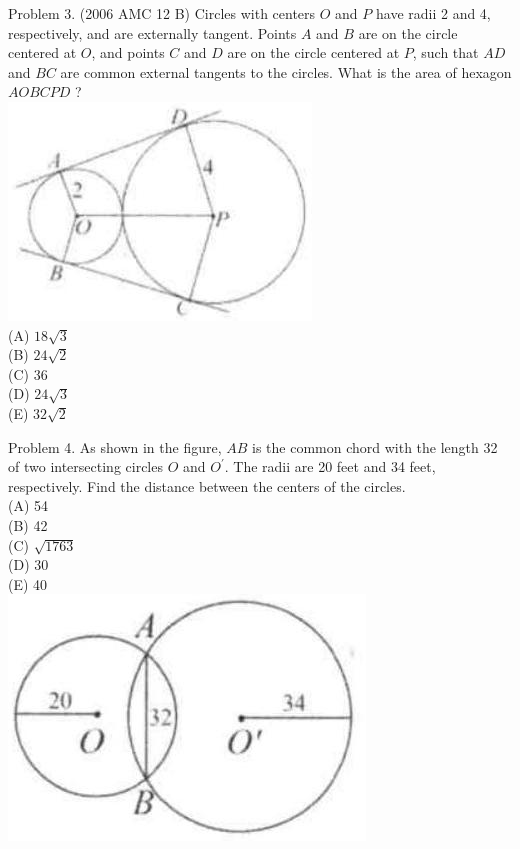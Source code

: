 \documentclass[10pt]{article}
\begin{document}
Problem 3. (2006 AMC 12 B) Circles with centers \(O\) and \(P\) have radii 2 and 4, respectively, and are externally tangent. Points \(A\) and \(B\) are on the circle centered at \(O\), and points \(C\) and \(D\) are on the circle centered at \(P\), such that \(A D\) and \(B C\) are common external tangents to the circles. What is the area of hexagon \(A O B C P D\) ?\\
\includegraphics[max width=\textwidth, center]{2025_04_17_97bc1f7e44d93c271a88g-184(3)}\\
(A) \(18 \sqrt{3}\)\\
(B) \(24 \sqrt{2}\)\\
(C) 36\\
(D) \(24 \sqrt{3}\)\\
(E) \(32 \sqrt{2}\)

Problem 4. As shown in the figure, \(A B\) is the common chord with the length 32 of two intersecting circles \(O\) and \(O^{\prime}\). The radii are 20 feet and 34 feet, respectively. Find the distance between the centers of the circles.\\
(A) 54\\
(B) 42\\
(C) \(\sqrt{1763}\)\\
(D) 30\\
(E) 40\\
\includegraphics[max width=\textwidth, center]{2025_04_17_97bc1f7e44d93c271a88g-184(1)}
\end{document}
